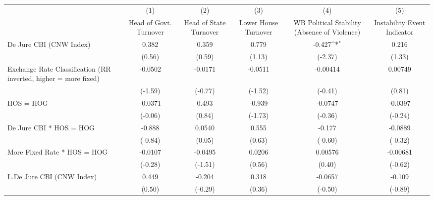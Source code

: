 {
\def\sym#1{\ifmmode^{#1}\else\(^{#1}\)\fi}
\begin{longtable}{l*{5}{c}}
\hline\hline\endfirsthead\hline\endhead\hline\endfoot\endlastfoot
                &\multicolumn{1}{c}{(1)}&\multicolumn{1}{c}{(2)}&\multicolumn{1}{c}{(3)}&\multicolumn{1}{c}{(4)}&\multicolumn{1}{c}{(5)}\\
                &\multicolumn{1}{c}{Head of Govt. Turnover}&\multicolumn{1}{c}{Head of State Turnover}&\multicolumn{1}{c}{Lower House Turnover}&\multicolumn{1}{c}{WB Political Stability (Absence of Violence)}&\multicolumn{1}{c}{Instability Event Indicator}\\
\hline
De Jure CBI (CNW Index)&    0.382         &    0.359         &    0.779         &   -0.427\sym{*}  &    0.216         \\
                &   (0.56)         &   (0.59)         &   (1.13)         &  (-2.37)         &   (1.33)         \\
[1em]
Exchange Rate Classification (RR inverted, higher = more fixed)&  -0.0502         &  -0.0171         &  -0.0511         & -0.00414         &  0.00749         \\
                &  (-1.59)         &  (-0.77)         &  (-1.52)         &  (-0.41)         &   (0.81)         \\
[1em]
HOS = HOG       &  -0.0371         &    0.493         &   -0.939         &  -0.0747         &  -0.0397         \\
                &  (-0.06)         &   (0.84)         &  (-1.73)         &  (-0.36)         &  (-0.24)         \\
[1em]
De Jure CBI * HOS = HOG&   -0.888         &   0.0540         &    0.555         &   -0.177         &  -0.0889         \\
                &  (-0.84)         &   (0.05)         &   (0.63)         &  (-0.60)         &  (-0.32)         \\
[1em]
More Fixed Rate * HOS = HOG&  -0.0107         &  -0.0495         &   0.0206         &  0.00576         & -0.00681         \\
                &  (-0.28)         &  (-1.51)         &   (0.56)         &   (0.40)         &  (-0.62)         \\
[1em]
L.De Jure CBI (CNW Index)&    0.449         &   -0.204         &    0.318         &  -0.0657         &   -0.109         \\
                &   (0.50)         &  (-0.29)         &   (0.36)         &  (-0.50)         &  (-0.89)         \\

\end{longtable}}
